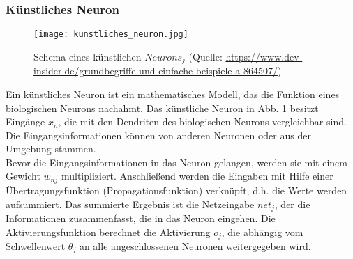 \subsubsection{Künstliches Neuron}
\label{subsubsec:KünstlichesNeuron}
\begin{figure}[ht]
	\centering
	\texttt{[image: kunstliches\_neuron.jpg]}
	\caption{Schema eines künstlichen $Neurons_j$ (Quelle: \url{https://www.dev-insider.de/grundbegriffe-und-einfache-beispiele-a-864507/})}
	\label{fig:KünstlichesNeuron}
\end{figure}
Ein künstliches Neuron ist ein mathematisches Modell, das die Funktion eines biologischen Neurons nachahmt. Das künstliche Neuron in Abb. \ref{fig:KünstlichesNeuron} besitzt Eingänge $x_n$, die mit den Dendriten des biologischen Neurons vergleichbar sind. Die Eingangsinformationen können von anderen Neuronen oder aus der Umgebung stammen. \\
Bevor die Eingangsinformationen in das Neuron gelangen, werden sie mit einem Gewicht $w_{nj}$ multipliziert. Anschließend werden die Eingaben mit Hilfe einer Übertragungsfunktion (Propagationsfunktion) verknüpft, d.h. die Werte werden aufsummiert. Das summierte Ergebnis ist die Netzeingabe $net_j$, der die Informationen zusammenfasst, die in das Neuron eingehen. Die Aktivierungsfunktion berechnet die Aktivierung $o_j$, die abhängig vom Schwellenwert $\theta_j$ an alle angeschlossenen Neuronen weitergegeben wird. \cite[vgl.][]{JuergenCleve2020}

